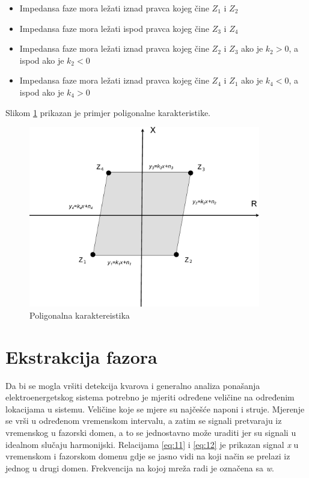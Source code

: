 \begin{itemize}
    \item Impedansa faze mora ležati iznad pravca kojeg čine $Z_1$ i $Z_2$
    \item Impedansa faze mora ležati ispod pravca kojeg čine $Z_3$ i $Z_4$
    \item Impedansa faze mora ležati iznad pravca kojeg čine $Z_2$ i $Z_3$ ako je $k_2 > 0$, a ispod ako je $k_2 < 0$
    \item Impedansa faze mora ležati iznad pravca kojeg čine $Z_4$ i $Z_1$ ako je $k_4 < 0$, a ispod ako je $k_4 > 0$
\end{itemize}

Slikom \ref{fig:poligonalna} prikazan je primjer poligonalne karakteristike. 

\begin{figure}[H]
  \centering
  \includegraphics[width=0.9\textwidth]{poligonalna}
  \caption{Poligonalna karaktereistika}
  \label{fig:poligonalna}
\end{figure}

\section{Ekstrakcija fazora}

Da bi se mogla vršiti detekcija kvarova i generalno analiza ponašanja elektroenergetskog sistema potrebno je mjeriti određene veličine na određenim lokacijama u sistemu. Veličine koje se mjere su najčešće naponi i struje. Mjerenje se vrši u određenom vremenskom intervalu, a zatim se signali pretvaraju iz vremenskog u fazorski domen, a to se jednostavno može uraditi jer su signali u idealnom slučaju harmonijski. Relacijama \ref{eq:11} i \ref{eq:12} je prikazan signal \textit{x} u vremenskom i fazorskom domenu gdje se jasno vidi na koji način se prelazi iz jednog u drugi domen. Frekvencija na kojoj mreža radi je označena sa \textit{w}. 

